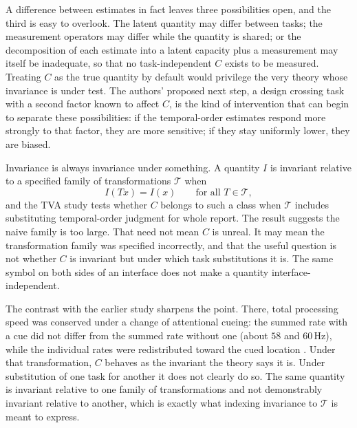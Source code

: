 \documentclass[11pt]{article}
\theoremstyle{definition}
\theoremstyle{remark}
\begin{document}
A difference between estimates in fact leaves three possibilities open, and the third is easy to overlook. The latent quantity may differ between tasks; the measurement operators may differ while the quantity is shared; or the decomposition of each estimate into a latent capacity plus a measurement may itself be inadequate, so that no task-independent $C$ exists to be measured. Treating $C$ as the true quantity by default would privilege the very theory whose invariance is under test. The authors' proposed next step, a design crossing task with a second factor known to affect $C$, is the kind of intervention that can begin to separate these possibilities: if the temporal-order estimates respond more strongly to that factor, they are more sensitive; if they stay uniformly lower, they are biased.

Invariance is always invariance under something. A quantity $I$ is invariant relative to a specified family of transformations $\mathcal{T}$ when
\begin{equation}
I(Tx) = I(x) \qquad \text{for all } T \in \mathcal{T},
\end{equation}
and the TVA study tests whether $C$ belongs to such a class when $\mathcal{T}$ includes substituting temporal-order judgment for whole report. The result suggests the naive family is too large. That need not mean $C$ is unreal. It may mean the transformation family was specified incorrectly, and that the useful question is not whether $C$ is invariant but under which task substitutions it is. The same symbol on both sides of an interface does not make a quantity interface-independent.

The contrast with the earlier study sharpens the point. There, total processing speed was conserved under a change of attentional cueing: the summed rate with a cue did not differ from the summed rate without one (about $58$ and $60$\,Hz), while the individual rates were redistributed toward the cued location \cite{tunnermann2015}. Under that transformation, $C$ behaves as the invariant the theory says it is. Under substitution of one task for another it does not clearly do so. The same quantity is invariant relative to one family of transformations and not demonstrably invariant relative to another, which is exactly what indexing invariance to $\mathcal{T}$ is meant to express.
\end{document}
